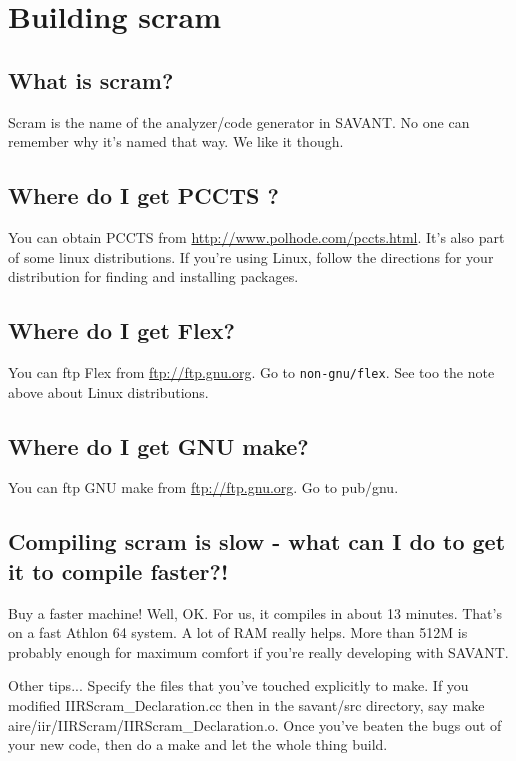 \documentclass[11pt]{article}
\begin{document}
\section{Building scram}

\subsection{What is scram?}

Scram is the name of the analyzer/code generator in SAVANT. No one can
remember why it's named that way. We like it though.

\subsection{Where do I get PCCTS ?}

You can obtain PCCTS from \url{http://www.polhode.com/pccts.html}.  It's
also part of some linux distributions.  If you're using Linux, follow the
directions for your distribution for finding and installing packages.

\subsection{Where do I get Flex?}

You can ftp Flex from \url{ftp://ftp.gnu.org}. Go to \texttt{non-gnu/flex}.
See too the note above about Linux distributions.

\subsection{Where do I get GNU make?}

You can ftp GNU make from \url{ftp://ftp.gnu.org}. Go to pub/gnu.

\subsection{Compiling scram is slow - what can I do to get it to compile faster?!}
Buy a faster machine! Well, OK. For us, it compiles in about 13 minutes.
That's on a fast Athlon 64 system. A lot of RAM really helps. More than
512M is probably enough for maximum comfort if you're really developing
with SAVANT.

Other tips... Specify the files that you've touched explicitly to make. If
you modified IIRScram\_Declaration.cc then in the savant/src directory, say
make aire/iir/IIRScram/IIRScram\_Declaration.o. Once you've beaten the bugs
out of your new code, then do a make and let the whole thing build.
\end{document}

